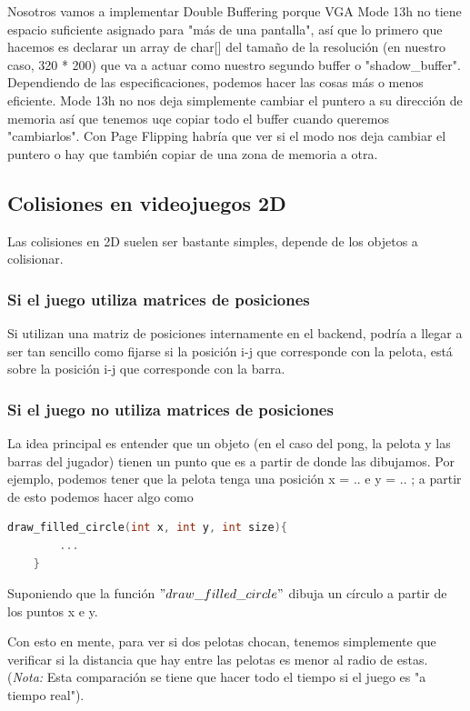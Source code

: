 \documentclass[]{article}
\begin{document}
Nosotros vamos a implementar Double Buffering porque VGA Mode 13h no tiene espacio suficiente asignado para "m\'as de una pantalla", as\'i que lo primero que hacemos es declarar un array de char[] del tamaño de la resoluci\'on (en nuestro caso, 320 * 200) que va a actuar como nuestro segundo buffer o "shadow\_buffer".\\

Dependiendo de las especificaciones, podemos hacer las cosas m\'as o menos eficiente. Mode 13h no nos deja simplemente cambiar el puntero a su direcci\'on de memoria as\'i que tenemos uqe copiar todo el buffer cuando queremos "cambiarlos". Con Page Flipping habr\'ia que ver si el modo nos deja cambiar el puntero o hay que tambi\'en copiar de una zona de memoria a otra.

\subsection*{Colisiones en videojuegos 2D}
Las colisiones en 2D suelen ser bastante simples, depende de los objetos a colisionar.

\subsubsection*{Si el juego utiliza matrices de posiciones}

Si utilizan una matriz de posiciones internamente en el backend, podr\'ia a llegar a ser tan sencillo como fijarse si la posici\'on i-j que corresponde con la pelota, est\'a sobre la posici\'on i-j que corresponde con la barra.

\subsubsection*{Si el juego no utiliza matrices de posiciones}
La idea principal es entender que un objeto (en el caso del pong, la pelota y las barras del jugador) tienen un punto que es a partir de donde las dibujamos. Por ejemplo, podemos tener que la pelota tenga una posici\'on x = .. e y = .. ; a partir de esto podemos hacer algo como

\begin{lstlisting}[language=C]
	draw_filled_circle(int x, int y, int size){
		...
	}
\end{lstlisting}

Suponiendo que la funci\'on $"draw\_filled\_circle"$ dibuja un c\'irculo a partir de los puntos x e y.

Con esto en mente, para ver si dos pelotas chocan, tenemos simplemente que verificar si la distancia que hay entre las pelotas es menor al radio de estas. (\textit{Nota:} Esta comparaci\'on se tiene que hacer todo el tiempo si el juego es "a tiempo real").\\
\end{document}
